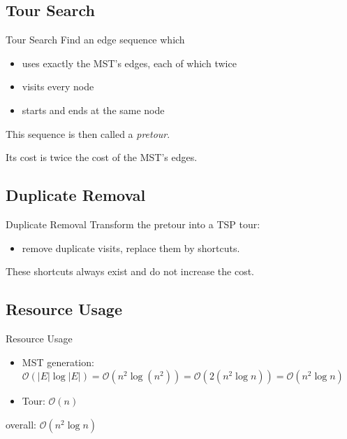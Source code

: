 \documentclass[%
	sans,
	12pt,
]{beamer}
\begin{document}
\subsection{Tour Search}
\begin{frame}{Tour Search}
Find an edge sequence which\pause
\begin{itemize}
	\item uses exactly the MST's edges, each of which twice\pause
	\item visits every node\pause
	\item starts and ends at the same node\pause
\end{itemize}
This sequence is then called a \textit{pretour}.\pause

Its cost is twice the cost of the MST's edges.
\end{frame}

\subsection{Duplicate Removal}
\begin{frame}{Duplicate Removal}
Transform the pretour into a TSP tour:
\begin{itemize}
	\item remove duplicate visits, replace them by shortcuts.
\end{itemize}
These shortcuts always exist and do not increase the cost. %
\end{frame}

\subsection{Resource Usage}
\begin{frame}{Resource Usage}
\begin{itemize}
	\item MST generation: $\mathcal{O}(|E| \log |E|) = \mathcal{O}(n^2 \log (n^2)) = \mathcal{O}(2(n^2 \log n)) = \mathcal{O}(n^2 \log n)$%
	\item Tour: $\mathcal{O}(n)$ %
\end{itemize}
overall: $\mathcal{O}(n^2 \log n)$
\end{frame}
\end{document}
